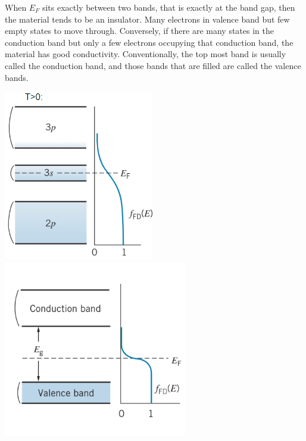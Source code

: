 \documentclass[11pt]{article}
\theoremstyle{break}
\theoremstyle{break}
\begin{document}
When $E_F$ sits exactly between two bands, that is exactly at the band gap, then the material tends to be an insulator. Many electrons in valence band but few empty states to move through. Conversely, if there are many states in the conduction band but only a few electrons occupying that conduction band, the material has good conductivity. Conventionally, the top most band is usually called the conduction band, and those bands that are filled are called the valence bands. 
\begin{center}
\includegraphics[scale=0.88]{bands1}\qquad\qquad\qquad
\includegraphics[scale=0.88]{bands2}
\end{center}
\end{document}
